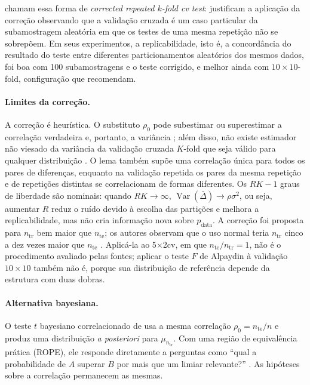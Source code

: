 \documentclass[11pt,a4paper]{article}
\newcommand{\tr}{\mathrm{tr}}
\newcommand{\te}{\mathrm{te}}
\newcommand{\Var}{\operatorname{Var}}
\begin{document}
\citet{bouckaert2004replicability} chamam essa forma de \emph{corrected
repeated $k$-fold cv test}: justificam a aplicação da correção observando que
a validação cruzada é um caso particular da subamostragem aleatória em que os
testes de uma mesma repetição não se sobrepõem. Em seus experimentos, a
replicabilidade, isto é, a concordância do resultado do teste entre diferentes
particionamentos aleatórios dos mesmos dados, foi boa com 100 subamostragens e
o teste corrigido, e melhor ainda com $10\times10$-fold, configuração que
recomendam.

\paragraph{Limites da correção.}
A correção é heurística. O substituto $\rho_0$ pode subestimar ou superestimar
a correlação verdadeira e, portanto, a variância \citep{nadeau2003inference};
além disso, não existe estimador não viesado da variância da validação cruzada
$K$-fold que seja válido para qualquer distribuição \citep{bengio2004noUnbiased}.
O lema também supõe uma correlação única para todos os pares de diferenças,
enquanto na validação repetida os pares da mesma repetição e de repetições
distintas se correlacionam de formas diferentes. Os $RK-1$ graus de liberdade
são nominais: quando $RK\to\infty$, $\Var(\bar\Delta)\to\rho\sigma^{2}$, ou seja,
aumentar $R$ reduz o ruído devido à escolha das partições e melhora a
replicabilidade, mas não cria informação nova sobre $p_{\text{data}}$. A correção foi
proposta para $n_{\tr}$ bem maior que $n_{\te}$; os autores observam que o uso
normal teria $n_{\tr}$ cinco a dez vezes maior que $n_{\te}$
\citep{nadeau2003inference}. Aplicá-la ao 5$\times$2cv, em que
$n_{\te}/n_{\tr}=1$, não é o procedimento avaliado pelas fontes; aplicar o teste
$F$ de Alpaydin à validação $10\times10$ também não é, porque sua distribuição
de referência depende da estrutura com duas dobras.

\paragraph{Alternativa bayesiana.}
O teste $t$ bayesiano correlacionado de \citet{corani2015bayesian} usa a mesma
correlação $\rho_0=n_{\te}/n$ e produz uma distribuição \emph{a posteriori}
para $\mu_{n_{\tr}}$. Com uma região de equivalência prática (ROPE), ele
responde diretamente a perguntas como ``qual a probabilidade de $A$ superar
$B$ por mais que um limiar relevante?'' \citep{benavoli2017timeforchange}. As
hipóteses sobre a correlação permanecem as mesmas.
\end{document}
